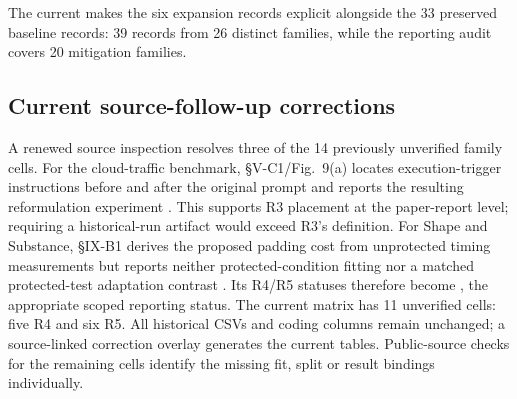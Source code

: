 The current  makes the six expansion records explicit alongside the 33 preserved baseline records: 39 records from 26 distinct families, while the reporting audit covers 20 mitigation families.

\subsection{Current source-follow-up corrections}
A renewed source inspection resolves three of the 14 previously unverified family cells. For the cloud-traffic benchmark, \S V-C1/Fig.~9(a) locates execution-trigger instructions before and after the original prompt and reports the resulting reformulation experiment \cite{pouryousef2026traffic}. This supports R3 placement at the paper-report level; requiring a historical-run artifact would exceed R3's definition. For Shape and Substance, \S IX-B1 derives the proposed padding cost from unprotected timing measurements but reports neither protected-condition fitting nor a matched protected-test adaptation contrast \cite{hadad2026shape}. Its R4/R5 statuses therefore become \NRR{}, the appropriate scoped reporting status. The current matrix has 11 unverified cells: five R4 and six R5. All historical CSVs and coding columns remain unchanged; a source-linked correction overlay generates the current tables. Public-source checks for the remaining cells identify the missing fit, split or result bindings individually.
